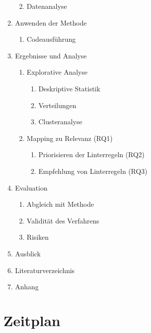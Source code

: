 \begin{enumerate}[label*=\arabic*.]
\begin{enumerate}[label*=\arabic*.]
\begin{enumerate}[label*=\arabic*.]
        \end{enumerate}
        \item Datenanalyse
    \end{enumerate}
    \item Anwenden der Methode
    \begin{enumerate}[label*=\arabic*.]
        \item Codeausführung
    \end{enumerate}
    \item Ergebnisse und Analyse
    \begin{enumerate}[label*=\arabic*.]
        \item Explorative Analyse
        \begin{enumerate}[label*=\arabic*.]
            \item Deskriptive Statistik
            \item Verteilungen
            \item Clusteranalyse
        \end{enumerate}
        \item Mapping zu Relevanz (RQ1)
        \begin{enumerate}[label*=\arabic*.]
            \item Priorisieren der Linterregeln (RQ2)
            \item Empfehlung von Linterregeln (RQ3)
        \end{enumerate}
    \end{enumerate}
    \item Evaluation
    \begin{enumerate}[label*=\arabic*.]
        \item Abgleich mit Methode
        \item Validität des Verfahrens
        \item Risiken
    \end{enumerate}
    \item Ausblick
    \item Literaturverzeichnis
    \item Anhang
\end{enumerate}

\section{Zeitplan}

\vspace{.5cm}

